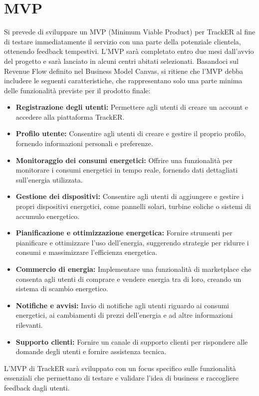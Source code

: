 \documentclass[oneside]{book}
\begin{document}
\section{MVP}
Si prevede di sviluppare un MVP (Minimum Viable Product) per TrackER al fine di testare immediatamente il servizio con una parte della potenziale clientela, ottenendo feedback tempestivi. L'MVP sarà completato entro due mesi dall'avvio del progetto e sarà lanciato in alcuni centri abitati selezionati. Basandoci sul Revenue Flow definito nel Business Model Canvas, si ritiene che l'MVP debba includere le seguenti caratteristiche, che rappresentano solo una parte minima delle funzionalità previste per il prodotto finale:

\begin{itemize}
    \item \textbf{Registrazione degli utenti:} Permettere agli utenti di creare un account e accedere alla piattaforma TrackER.
    \item \textbf{Profilo utente:} Consentire agli utenti di creare e gestire il proprio profilo, fornendo informazioni personali e preferenze.
    \item \textbf{Monitoraggio dei consumi energetici:} Offrire una funzionalità per monitorare i consumi energetici in tempo reale, fornendo dati dettagliati sull'energia utilizzata.
    \item \textbf{Gestione dei dispositivi:} Consentire agli utenti di aggiungere e gestire i propri dispositivi energetici, come pannelli solari, turbine eoliche o sistemi di accumulo energetico.
    \item \textbf{Pianificazione e ottimizzazione energetica:} Fornire strumenti per pianificare e ottimizzare l'uso dell'energia, suggerendo strategie per ridurre i consumi e massimizzare l'efficienza energetica.
    \item \textbf{Commercio di energia:} Implementare una funzionalità di marketplace che consenta agli utenti di comprare e vendere energia tra di loro, creando un sistema di scambio energetico.
    \item \textbf{Notifiche e avvisi:} Invio di notifiche agli utenti riguardo ai consumi energetici, ai cambiamenti di prezzi dell'energia e ad altre informazioni rilevanti.
    \item \textbf{Supporto clienti:} Fornire un canale di supporto clienti per rispondere alle domande degli utenti e fornire assistenza tecnica.
\end{itemize}

L'MVP di TrackER sarà sviluppato con un focus specifico sulle funzionalità essenziali che permettano di testare e validare l'idea di business e raccogliere feedback dagli utenti.
\end{document}
